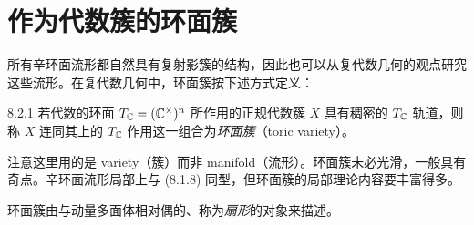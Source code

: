
\section{作为代数簇的环面簇}

所有辛环面流形都自然具有复射影簇的结构，因此也可以从复代数几何的观点研究这些流形。在复代数几何中，环面簇按下述方式定义：

\begin{definition}{8.2.1}
  若代数的环面 $T_{\mathbb{C}}=(\mathbb{C}^\times)^n$ 所作用的正规代数簇 $X$ 具有稠密的 $T_{\mathbb{C}}$ 轨道，则称 $X$ 连同其上的 $T_{\mathbb{C}}$ 作用这一组合为\emph{环面簇}（toric variety）。
\end{definition}

注意这里用的是 variety（簇）而非 manifold（流形）。环面簇未必光滑，一般具有奇点。辛环面流形局部上与 (8.1.8) 同型，但环面簇的局部理论内容要丰富得多。

环面簇由与动量多面体相对偶的、称为\emph{扇形}的对象来描述。


